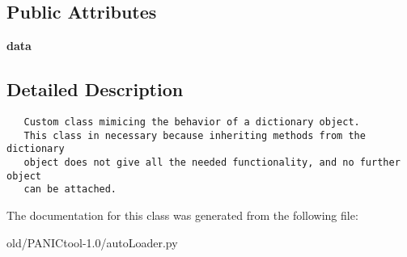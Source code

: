 \subsection*{Public Attributes}
\begin{CompactItemize}
\item 
\textbf{data}\label{classautoLoader_1_1UserDict_a3ce6477de9edf79bdd6cf247037499c}

\end{CompactItemize}


\subsection{Detailed Description}


\footnotesize\begin{verbatim}
   Custom class mimicing the behavior of a dictionary object.
   This class in necessary because inheriting methods from the dictionary
   object does not give all the needed functionality, and no further object
   can be attached.
\end{verbatim}
\normalsize
 



The documentation for this class was generated from the following file:\begin{CompactItemize}
\item 
old/PANICtool-1.0/auto\-Loader.py\end{CompactItemize}
